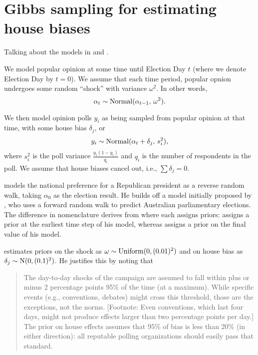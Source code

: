 \documentclass[thesis.tex]{subfiles}
\begin{document}
\section{Gibbs sampling for estimating house biases}

Talking about the models in \cite{Strauss:2007aa} and \cite{Jackman:2005aa}.

We model popular opinion at some time until Election Day \(t\) (where we denote Election Day by \(t = 0\)). We assume that each time period, popular opnion undergoes some random ``shock'' with variance \(\omega^2\). In other words, \[
	\alpha_t \sim \operatorname{Normal}(\alpha_{t-1},\, \omega^2).
\]

We then model opinion polls \(y_i\) as being sampled from popular opinion at that time, with some house bias \(\delta_j\), or \[
	y_i \sim \operatorname{Normal}(\alpha_t + \delta_j,\, s_i^2),
\] where \(s_i^2\) is the poll variance \(\frac{y_i(1-y_i)}{q_i}\) and \(q_i\) is the number of respondents in the poll. We assume that house biases cancel out, i.e., \(\sum \delta_j = 0\).

\citet{Strauss:2007aa} models the national preference for a Republican president as a reverse random walk, taking $\alpha_0$ as the election result. He builds off a model initially proposed by \citet{Jackman:2005aa}, who uses a forward random walk to predict Australian parliamentary elections. The difference in nomenclature derives from where each assigns priors: \citet{Jackman:2005aa} assigns a prior at the earliest time step of his model, whereas \citet{Strauss:2007aa} assigns a prior on the final value of his model.

\citet{Strauss:2007aa} estimates priors on the shock as \(
\omega \sim \operatorname{Uniform}(0, (0.01)^2)\) and on house bias as  \(
\delta_j \sim \operatorname{N}(0, (0.1)^2)\). He justifies this by noting that
\begin{quote}
The day-to-day shocks of the campaign are assumed to fall within plus or minus 2 percentage points 95\% of the time (at a maximum). While specific events (e.g., conventions, debates) might cross this threshold, those are the exceptions, not the norms. [Footnote: Even conventions, which last four days, might not produce effects larger than two percentage points per day.] The prior on house effects assumes that 95\% of bias is less than 20\% (in either direction): all reputable polling organizations should easily pass that standard.
\end{quote}

\begin{comment}
\emph{TODO talk about priors at all? Or just reference from before?} He uses the Campbell (\citeyear{Campbell:1992aa,Campbell:2006aa}) prior on the national outcome, predicted off of a number of indicators. This gives \(\alpha_0 \sim \N(0.522, (0.0253)^2)\) for the 2008 election (calculated before polling information is available).
\end{comment}
\end{document}
